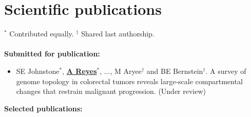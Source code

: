 \documentclass[11pt,a4paper,sans]{moderncv} %
\begin{document}
\section{Scientific publications}
\vspace{-.1cm}
\footnotesize{$^{\ast}$ Contributed equally.} \hspace{.5cm}
\footnotesize{$^{\dagger}$ Shared last authorship.} \\
\\
\vspace{-.1cm}
\textbf{Submitted for publication:}
\begin{itemize}
\item SE Johnstone$^{\ast}$, \textbf{\underline{A Reyes}}$^{\ast}$,
  ..., M Aryee$^{\dagger}$ and BE Bernstein$^{\dagger}$. A survey of
  genome topology in colorectal tumors reveals large-scale
  compartmental changes that restrain malignant progression. (Under review)
\end{itemize}
\vspace{.1cm}
\textbf{Selected publications:}
\end{document}
